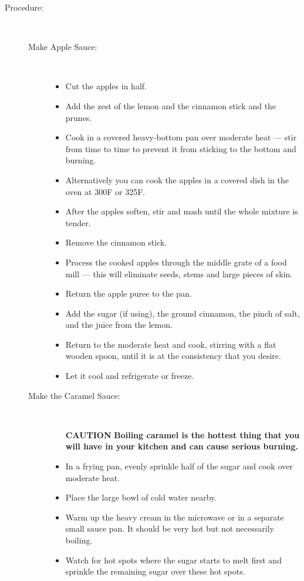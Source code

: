 \documentclass [11pt, letterpaper] {article}
\begin{document}
\begin{description}
\item[Procedure:]\ \\
	\begin{description}
	\item[Make Apple Sauce:]\ \\
		\begin{itemize}
			\item Cut the apples in half.
			\item Add the zest of the lemon and the cinnamon stick and the prunes.
			\item Cook in a covered heavy-bottom pan over moderate heat --- stir from time to time to prevent it from sticking to the bottom and burning.
			\item Alternatively you can cook the apples in a covered dish in the oven at 300F or 325F.
			\item After the apples soften, stir and mash until the whole mixture is tender.
			\item Remove the cinnamon stick.
			\item Process the cooked apples through the middle grate of a food mill --- this will eliminate seeds, stems and large pieces of skin.
			\item Return the apple puree to the pan.
			\item Add the sugar (if using), the ground cinnamon, the pinch of salt, and the juice from the lemon.
			\item Return to the moderate heat and cook, stirring with a flat wooden spoon, until it is at the consistency that you desire.
			\item Let it cool and refrigerate or freeze.
		\end{itemize}
	\item[Make the Caramel Sauce:]\ \\
		\begin{itemize}
			\item [{\bf CAUTION}] {\bf Boiling caramel is the hottest thing that you will have in your kitchen and can cause serious burning.}
			\item	In a  frying pan, evenly sprinkle half of the sugar and cook over moderate heat. 
			\item Place the large bowl of cold water nearby.
			\item Warm up the heavy cream in the microwave or in a separate small sauce pan. It should be very hot but not necessarily boiling.
			\item Watch for hot spots where the sugar starts to melt first and sprinkle the remaining sugar over these hot spots.

\end{itemize}
\end{description}
\end{description}
\end{document}
